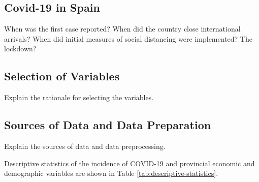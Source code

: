 \documentclass[]{elsarticle} %
\begin{document}
\hypertarget{covid-19-in-spain}{%
\subsection{Covid-19 in Spain}\label{covid-19-in-spain}}

When was the first case reported? When did the country close
international arrivals? When did initial measures of social distancing
were implemented? The lockdown?

\hypertarget{selection-of-variables}{%
\subsection{Selection of Variables}\label{selection-of-variables}}

Explain the rationale for selecting the variables.

\hypertarget{sources-of-data-and-data-preparation}{%
\subsection{Sources of Data and Data
Preparation}\label{sources-of-data-and-data-preparation}}

Explain the sources of data and data preprocessing.

Descriptive statistics of the incidence of COVID-19 and provincial
economic and demographic variables are shown in Table
\ref{tab:descriptive-statistics}.

\begin{table}

\caption{\label{tab:descriptive-statistics}\label{tab:descriptive-statistics}Descriptive statistics}
\centering
{}
\end{table}
\end{document}

